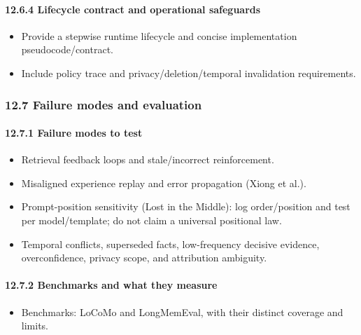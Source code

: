 \paragraph{12.6.4 Lifecycle contract and operational safeguards}\label{1264-lifecycle-contract-and-operational-safeguards}

\begin{itemize}
\tightlist
\item
  Provide a stepwise runtime lifecycle and concise implementation pseudocode/contract.
\item
  Include policy trace and privacy/deletion/temporal invalidation requirements.
\end{itemize}

\subsubsection{12.7 Failure modes and evaluation}\label{127-failure-modes-and-evaluation}

\paragraph{12.7.1 Failure modes to test}\label{1271-failure-modes-to-test}

\begin{itemize}
\tightlist
\item
  Retrieval feedback loops and stale/incorrect reinforcement.
\item
  Misaligned experience replay and error propagation (Xiong et al.).
\item
  Prompt-position sensitivity (Lost in the Middle): log order/position and test per model/template; do not claim a universal positional law.
\item
  Temporal conflicts, superseded facts, low-frequency decisive evidence, overconfidence, privacy scope, and attribution ambiguity.
\end{itemize}

\paragraph{12.7.2 Benchmarks and what they measure}\label{1272-benchmarks-and-what-they-measure}

\begin{itemize}
\tightlist
\item
  Benchmarks: LoCoMo and LongMemEval, with their distinct coverage and limits.
\end{itemize}

